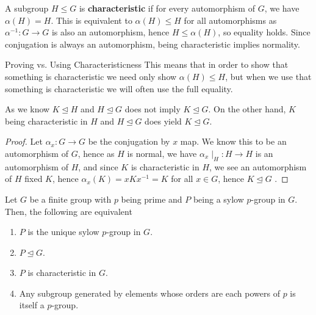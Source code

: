 \begin{definition}
	A subgroup \(H \le G\) is \textbf{characteristic} if for every automorphism of \(G\), we have \(\alpha \left( H \right) = H  \). This is equivalent to \(\alpha\left( H \right)  \le H\) for all automorphisms as \(\alpha^{-1}: G \to G\) is also an automorphism, hence \(H \le \alpha \left( H \right) \), so equality holds. Since conjugation is always an automorphism, being characteristic implies normality.
\end{definition}
\begin{note}{Proving vs. Using Characteristicness}
	This means that in order to show that something is characteristic we need only show \(\alpha\left( H \right) \le H\), but when we use that something is characteristic we will often use the full equality.
\end{note}
\begin{lemma}
	As we know \(K \trianglelefteq H\) and \( H \trianglelefteq G\) does not imply \(K \trianglelefteq G\). On the other hand, \(K\) being characteristic in \(H\) and \(H\trianglelefteq G\) does yield \(K \trianglelefteq G\).
\end{lemma}
\begin{proof}
	Let \(\alpha_{x}: G \to G\) be the conjugation by \(x\) map. We know this to be an automorphism of \(G\), hence as \(H\) is normal, we have \(\alpha_{x}\mid_{H} : H \to H\) is an automorphism of \(H\), and since \(K\) is characteristic in \(H\), we see an automorphism of \(H\) fixed \(K\), hence \(\alpha_{x}\left( K \right) = xKx^{-1} = K \) for all \(x \in G\), hence \(K \trianglelefteq G\) .
\end{proof}
\begin{lemma}
	Let \(G\) be a finite group with \(p\) being prime and \(P\) being a sylow \(p\)-group in \(G\). Then, the following are equivalent
	\begin{enumerate}
		\item \(P\) is the unique sylow \(p\)-group in \(G\).
			\item \(P \trianglelefteq G\).
				\item \(P\) is characteristic in \(G\).
	\item Any subgroup generated by elements whose orders are each powers of \(p\) is itself a \(p\)-group.
	\end{enumerate}
\end{lemma}
